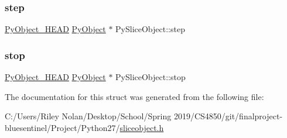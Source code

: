 \mbox{\label{struct_py_slice_object_ae7c2f6781b414d4c94fd25c14ff67a11}} 
\subsubsection{\texorpdfstring{step}{step}}
{\footnotesize\ttfamily \mbox{\hyperlink{_python27_2object_8h_a0bf35c1f3ea13f925de94d8593db3b7e}{Py\+Object\+\_\+\+H\+E\+AD}} \mbox{\hyperlink{_python27_2object_8h_aadc84ac7aed2cfa6f20c25f62bf3dac7}{Py\+Object}} $\ast$ Py\+Slice\+Object\+::step}

\mbox{\label{struct_py_slice_object_a742f61e756c53435c990658d22f9f463}} 
\subsubsection{\texorpdfstring{stop}{stop}}
{\footnotesize\ttfamily \mbox{\hyperlink{_python27_2object_8h_a0bf35c1f3ea13f925de94d8593db3b7e}{Py\+Object\+\_\+\+H\+E\+AD}} \mbox{\hyperlink{_python27_2object_8h_aadc84ac7aed2cfa6f20c25f62bf3dac7}{Py\+Object}} $\ast$ Py\+Slice\+Object\+::stop}



The documentation for this struct was generated from the following file\+:\begin{DoxyCompactItemize}
\item 
C\+:/\+Users/\+Riley Nolan/\+Desktop/\+School/\+Spring 2019/\+C\+S4850/git/finalproject-\/bluesentinel/\+Project/\+Python27/\mbox{\hyperlink{sliceobject_8h}{sliceobject.\+h}}\end{DoxyCompactItemize}
